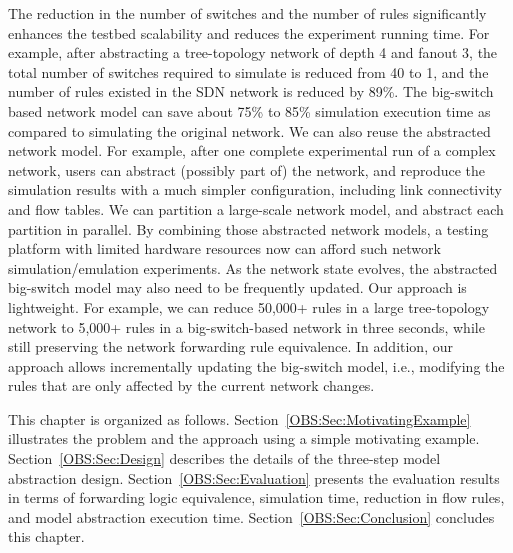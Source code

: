 The reduction in the number of switches and the number of rules significantly enhances the testbed scalability and reduces the experiment running time.
For example, after abstracting a tree-topology network of depth 4 and fanout 3,
the total number of switches required to simulate is reduced from 40 to 1, and the number of rules existed in the SDN network is reduced by 89\%.
The big-switch based network model can save about
75\% to 85\% simulation execution time as compared to simulating the original network.
We can also reuse the abstracted network model.
For example, after one complete experimental run of a complex network,
users can abstract (possibly part of) the network, and reproduce the simulation results with
a much simpler configuration, including link connectivity and flow tables.
We can partition a large-scale network model, and abstract each partition in parallel.
By combining those abstracted network models, a testing platform with limited hardware resources
now can afford such network simulation/emulation experiments.
As the network state evolves, the abstracted big-switch model may also need to be frequently updated.
Our approach is lightweight. For example, we can reduce 50,000+ rules in a large tree-topology network
to 5,000+ rules in a big-switch-based network in three seconds, 
while still preserving the network forwarding rule equivalence.
In addition, our approach allows incrementally updating the big-switch model,
i.e., modifying the rules that are only affected by the current network changes.

This chapter is organized as follows.
Section~\ref{OBS:Sec:MotivatingExample} illustrates the problem and the approach using a simple motivating example.
Section~\ref{OBS:Sec:Design} describes the details of the three-step model abstraction design.
Section~\ref{OBS:Sec:Evaluation} presents the evaluation results in terms of forwarding logic equivalence, simulation time,
reduction in flow rules, and model abstraction execution time.
Section~\ref{OBS:Sec:Conclusion} concludes this chapter.
